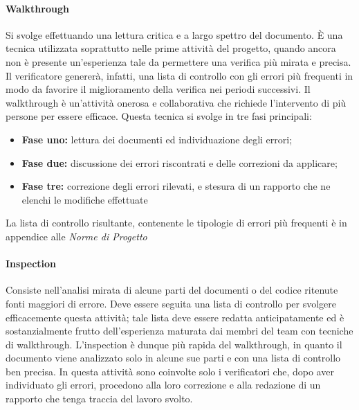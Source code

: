     \paragraph{Walkthrough}
    Si svolge effettuando una lettura critica e a largo spettro del documento.
È una tecnica utilizzata soprattutto nelle prime attività del progetto, quando ancora
non è presente un'esperienza tale da permettere una verifica più mirata e precisa. 
Il verificatore genererà, infatti, una lista di controllo con gli errori più frequenti
in modo da favorire il miglioramento della verifica nei periodi successivi.
Il walkthrough è un'attività onerosa e collaborativa che richiede l'intervento di
più persone per essere efficace. Questa tecnica si svolge in tre fasi principali:
\begin{itemize}
\item \textbf{Fase uno:} lettura dei documenti ed individuazione degli errori;
\item \textbf{Fase due:} discussione dei errori riscontrati e delle correzioni da applicare;
\item \textbf{Fase tre:} correzione degli errori rilevati, e stesura di un rapporto che ne elenchi le modifiche effettuate
\end{itemize}

La lista di controllo risultante, contenente le tipologie di errori più frequenti è in appendice alle 
\emph{Norme di Progetto \VersioneNP{}}

    \paragraph{Inspection}
	Consiste nell'analisi mirata di alcune parti del documenti o del codice ritenute fonti maggiori di errore. Deve essere seguita una lista di controllo per svolgere efficacemente questa attività; tale lista deve essere redatta anticipatamente ed è sostanzialmente frutto dell'esperienza maturata dai membri del team con tecniche di walkthrough.
L'inspection è dunque più rapida del walkthrough, in quanto il documento viene
analizzato solo in alcune sue parti e con una lista di controllo ben precisa. In questa
attività sono coinvolte solo i verificatori che, dopo aver individuato gli errori, procedono
alla loro correzione e alla redazione di un rapporto che tenga traccia del lavoro svolto.

